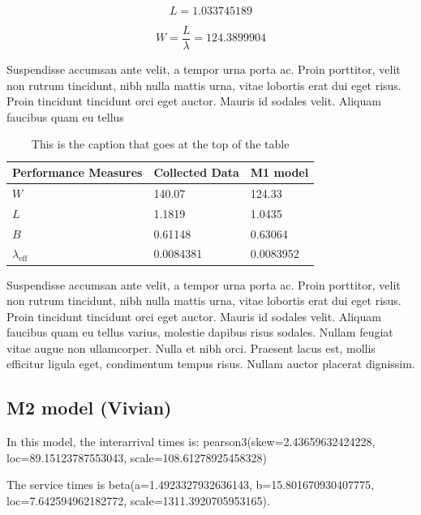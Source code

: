 \documentclass{article}
\begin{document}
$$
L = 1.033745189
$$

$$
W = \frac{L}{\lambda} = 124.3899904
$$



Suspendisse accumsan ante velit, a tempor urna porta ac. Proin porttitor, velit non rutrum tincidunt, nibh nulla mattis urna, vitae lobortis erat dui eget risus. Proin tincidunt tincidunt orci eget auctor. Mauris id sodales velit. Aliquam faucibus quam eu tellus

\begin{table}[h!]
    \centering
    \caption{This is the caption that goes at the top of the table}
    \begin{tabu}{*{3}{X[c]}}
        \toprule
        \textbf{Performance Measures} & \textbf{Collected Data} & \textbf{M1 model}\\
        \midrule
        $W$ & 140.07 & 124.33\\
        $L$ & 1.1819 & 1.0435\\
        $B$ & 0.61148 & 0.63064\\
        $\lambda_{\text{eff}}$ & 0.0084381 & 0.0083952\\
        \bottomrule
    \end{tabu}
    \label{tab:M1}
\end{table}

Suspendisse accumsan ante velit, a tempor urna porta ac. Proin porttitor, velit non rutrum tincidunt, nibh nulla mattis urna, vitae lobortis erat dui eget risus. Proin tincidunt tincidunt orci eget auctor. Mauris id sodales velit. Aliquam faucibus quam eu tellus varius, molestie dapibus risus sodales. Nullam feugiat vitae augue non ullamcorper. Nulla et nibh orci. Praesent lacus est, mollis efficitur ligula eget, condimentum tempus risus. Nullam auctor placerat dignissim.

\subsection{M2 model (Vivian)}

In this model, the interarrival times is:\newline
pearson3(skew=2.43659632424228, loc=89.15123787553043, scale=108.61278925458328)\newline

The service times is\newline
beta(a=1.4923327932636143, b=15.801670930407775, loc=7.642594962182772, scale=1311.3920705953165).\newline
\end{document}
